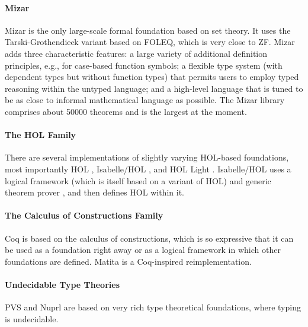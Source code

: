 \paragraph{Mizar}
Mizar is the only large-scale formal foundation based on set theory. It uses the Tarski-Grothendieck variant based on FOLEQ, which is very close to ZF. Mizar adds three characteristic features: a large variety of additional definition principles, e.g., for case-based function symbols; a flexible type system (with dependent types but without function types) that permits users to employ typed reasoning within the untyped language; and a high-level language that is tuned to be as close to informal mathematical language as possible. The Mizar library comprises about 50000 theorems and is the largest at the moment.

\paragraph{The HOL Family}
There are several implementations of slightly varying HOL-based foundations, most importantly HOL \cite{hol}, Isabelle/HOL \cite{isabellehol}, and HOL Light \cite{hollight}. Isabelle/HOL uses a logical framework (which is itself based on a variant of HOL) and generic theorem prover \cite{isabelle}, and then defines HOL within it.

\paragraph{The Calculus of Constructions Family}
Coq \cite{coq} is based on the calculus of constructions, which is so expressive that it can be used as a foundation right away or as a logical framework in which other foundations are defined. Matita \cite{matita} is a Coq-inspired reimplementation.

\paragraph{Undecidable Type Theories}
PVS \cite{pvs} and Nuprl \cite{nuprl} are based on very rich type theoretical foundations, where typing is undecidable.
